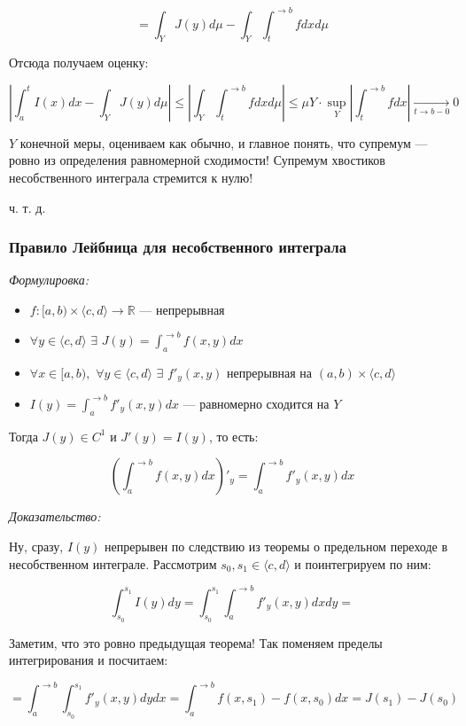 \documentclass{article}
\def\dbl{\,\,}
\def\goesto#1{\underset{#1}{\longrightarrow}}
\begin{document}
\[= \int_{Y} J(y) d\mu - \int_{Y} \int_t^{\rightarrow b} f dx d\mu\]

Отсюда получаем оценку:

\[\left| \int_a^t I(x) dx - \int_{Y} J(y) d\mu\right| \le \left| \int_{Y} \int_t^{\rightarrow b} f dx d\mu\right| \le \mu Y \cdot \sup_{Y} \left| \int_t^{\rightarrow b}f dx\right| \goesto{t \rightarrow b - 0} 0 \]

$Y$ конечной меры, оцениваем как обычно, и главное понять, что супремум --- ровно из определения равномерной сходимости! Супремум хвостиков несобственного интеграла стремится к нулю!

ч. т. д.

\subsubsection{Правило Лейбница для несобственного интеграла}
\textit{Формулировка:}

\begin{itemize}
    \item $f: [a, b) \times \langle c, d \rangle \rightarrow \mathbb{R}$ --- непрерывная
    \item $\forall y \in \langle c, d \rangle \dbl \exists \dbl J(y) = \int_a^{\rightarrow b} f(x, y) dx$
    \item $\forall x \in [a, b), \dbl \forall y \in \langle c, d \rangle \dbl \exists \dbl f'_y(x, y)$ непрерывная на $(a, b) \times \langle c, d \rangle$
    \item $I(y) = \int_a^{\rightarrow b} f'_y(x, y) dx$ --- равномерно сходится на $Y$
\end{itemize}

Тогда $J(y) \in C^1$ и $J'(y) = I(y)$, то есть:

\[\left(\int_a^{\rightarrow b} f(x, y) dx\right)'_y = \int_a^{\rightarrow b} f'_y(x, y) dx\]

\textit{Доказательство:}

Ну, сразу, $I(y)$ непрерывен по следствию из теоремы о предельном переходе в несобственном интеграле. Рассмотрим $s_0, s_1 \in \langle c, d \rangle$ и поинтегрируем по ним:

\[\int_{s_0}^{s_1} I(y) dy = \int_{s_0}^{s_1} \int_a^{\rightarrow b} f'_y(x, y) dx dy = \]

Заметим, что это ровно предыдущая теорема! Так поменяем пределы интегрирования и посчитаем:

\[= \int_a^{\rightarrow b} \int_{s_0}^{s_1} f'_y(x, y) dy dx = \int_{a}^{\rightarrow b} f(x, s_1) - f(x, s_0) dx = J(s_1) - J(s_0)\]
\end{document}
